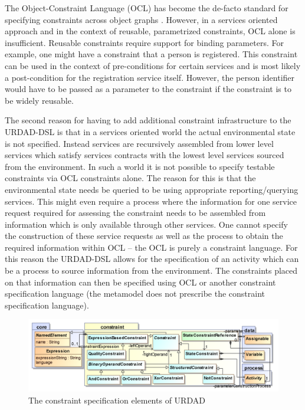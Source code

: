 The Object-Constraint Language (OCL) has become the de-facto standard for specifying constraints across object graphs \cite{_object_2010}. However, in a services oriented approach and in the context of reusable, parametrized constraints, OCL alone is insufficient.
Reusable constraints require support for binding parameters. For example, one might have a constraint that a person is registered. This constraint can be used in the context of pre-conditions for certain services and is most likely a post-condition for the registration service itself. However, the person identifier would have to be passed as a parameter to the constraint if the constraint is to be widely reusable.

The second reason for having to add additional constraint infrastructure to the URDAD-DSL is that in a services oriented world the actual environmental state is not specified. Instead services are recursively assembled from lower level services which satisfy services contracts with the lowest level services sourced from the environment. In such a world it is not possible to specify testable constraints via OCL constraints alone. The reason for this is that the environmental state needs be queried to be using appropriate reporting/querying services. This might even require a process where the information for one service request required for assessing the constraint needs to be assembled from information which is only available through other services. One cannot specify the construction of these service requests as well as the process to obtain the required information within OCL -- the OCL is purely a constraint language. For this reason the URDAD-DSL allows for the specification of an activity which can be a process to source information from the environment. The constraints placed on that information can then be specified using OCL or another constraint specification language (the metamodel does not prescribe the constraint specification language).

\begin{figure}[Htbp]
  \centering
  \includegraphics{constraint}
  \caption{The constraint specification elements of URDAD}
  \label{fig:metamodel}
\end{figure}

